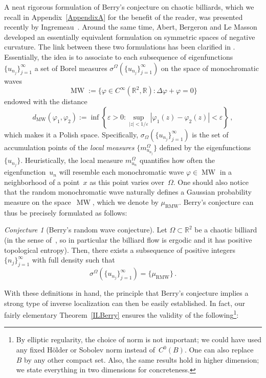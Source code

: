 \documentclass{amsart}
\theoremstyle{definition}
\theoremstyle{remark}
\newcommand{\ep}{\varepsilon}
\newcommand{\si}{\sigma}
\newcommand{\vp}{\varphi}
\newcommand{\De}{\Delta}
\newcommand{\Om}{\Omega}
\def\RR{\mathbb{R}}
\numberwithin{equation}{section}
\theoremstyle{definition}
\theoremstyle{remark}
\def\RR{\mathbb{R}}
\DeclareMathOperator\MW{MW}
\newcommand\dMW{d_{\MW}}
\newcommand\muRMW{\mu_{\mathrm{RMW}}}
\newtheorem*{conjecture*}{Conjecture}
\begin{document}
A neat rigorous formulation of Berry's conjecture on chaotic billiards, which we recall in Appendix~\ref{AppendixA} for the benefit of the reader, was presented recently by Ingremeau~\cite{Ingremeau}. Around the same time, Abert, Bergeron and Le Masson~\cite{ABLM} developed an essentially equivalent formulation on symmetric spaces of negative curvature. The link between these two formulations has been clarified
in \cite{Yo}. Essentially, the idea is to associate to each subsequence of eigenfunctions $\{u_{n_j}\}_{j=1}^\infty$ a set of Borel measures $\si^\Om(\{u_{n_j}\}_{j=1}^\infty)$ on the space of monochromatic waves
\begin{equation}
	\MW:=\{\vp\in C^\infty(\RR^2,\RR): \De \vp + \vp =0\}
\end{equation}
endowed with the distance
\begin{equation}
	\dMW(\vp_1,\vp_2):=\inf\left\{\ep>0: \sup_{|z|<1/\ep}|\vp_1(z)-\vp_2(z)|<\ep  \right\}\,,
\end{equation}
which makes it a Polish space. Specifically, $\si_\Om(\{u_{n_j}\}_{j=1}^\infty)$ is the set of accumulation points of the {\em local measures} $\{m^\Om_{u_{n_j}}\}$ defined by the eigenfunctions~$\{u_{n_j}\}$. Heuristically, the local measure $m^\Om_{u_{n}}$ quantifies how often the eigenfunction~$u_n$ will resemble each monochromatic wave $\vp\in\MW$ in a neighborhood of a point~$x$ as this point varies over~$\Om$.  One should also notice that the random monochromatic wave naturally defines a Gaussian probability measure on the space~$\MW$, which we denote by $\muRMW$. Berry's conjecture can thus be precisely formulated as follows:


\begin{conjecture*}[Berry's random wave conjecture] Let $\Om\subset\RR^2$ be a chaotic billiard (in the sense of~\cite[Section 2]{ChernovMarkarian2006}, so in particular the billiard flow is ergodic and it has positive topological entropy). Then, there exists a subsequence of positive integers $\{n_j\}_{j=1}^\infty$ with full density such that
	\begin{equation}\label{E.siQUE}
		\si^\Om(\{u_{n_j}\}_{j=1}^\infty)=\{\muRMW\}\,.
	\end{equation}
\end{conjecture*}

With these definitions in hand, the principle that Berry's conjecture implies a strong type of inverse localization can then be easily established. In fact, our fairly elementary Theorem~\ref{ILBerry} ensures the validity of the following\footnote{By elliptic regularity, the choice of norm is not important; we could have used any fixed H\"older or Sobolev norm instead of~$C^0(B)$. One can also replace~$B$ by any other compact set. Also, the same results hold in higher dimension; we state everything in two dimensions for concreteness.}:
\end{document}
